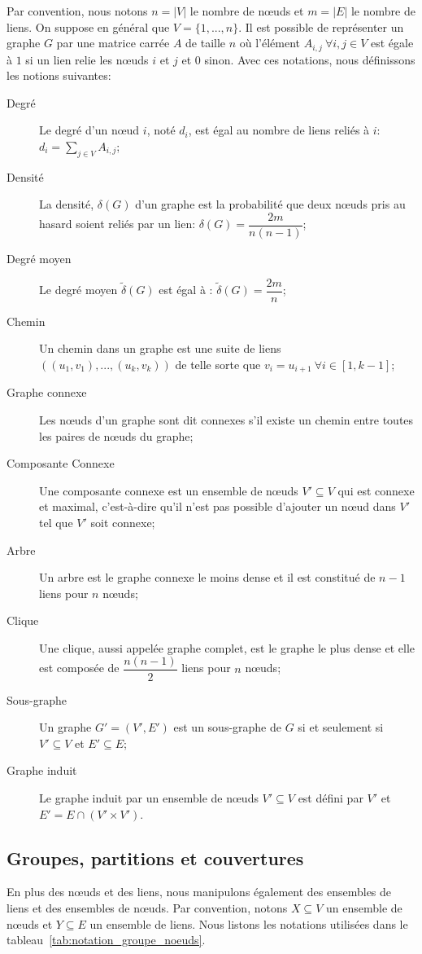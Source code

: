 Par convention, nous notons $n=|V|$ le nombre de n\oe{}uds et $m=|E|$ le nombre de liens.
On suppose en général que $V=\{1, ..., n\}$.
Il est possible de représenter un graphe $G$ par une matrice carrée $A$ de taille $n$ où l'élément $A_{i,j} \ \forall i,j \in V$ est égale à $1$ si un lien relie les n\oe{}uds $i$ et $j$ et $0$ sinon.
Avec ces notations, nous définissons les notions suivantes:
\begin{description}
\item[Degré] Le degré d'un n\oe{}ud $i$, noté $d_i$, est égal au nombre de liens reliés à $i$: $d_i = \sum_{j \in V} A_{i,j}$;
\item[Densité] La densité, $\delta(G)$ d'un graphe est la probabilité que deux n\oe{}uds pris au hasard soient reliés par un lien: $\delta(G)=\dfrac{2m}{n(n-1)}$;
\item[Degré moyen] Le degré moyen $\tilde{\delta}(G)$ est égal à : $\tilde{\delta}(G)=\dfrac{2m}{n}$;
\item[Chemin] Un chemin dans un graphe est une suite de liens $((u_1,v_1),...,(u_k,v_k))$ de telle sorte que $v_{i}=u_{i+1} \ \forall i \in [1,k-1]$;
\item[Graphe connexe] Les n\oe{}uds d'un graphe sont dit connexes s'il existe un chemin entre toutes les paires de n\oe{}uds du graphe;
\item[Composante Connexe] Une composante connexe est un ensemble de n\oe{}uds $V'\subseteq V$ qui est connexe et maximal, c'est-à-dire qu'il n'est pas possible d'ajouter un n\oe{}ud dans $V'$ tel que $V'$ soit connexe;
\item[Arbre] Un arbre est le graphe connexe le moins dense et il est constitué de $n-1$ liens pour $n$ n\oe{}uds;
\item[Clique] Une clique, aussi appelée graphe complet, est le graphe le plus dense et elle est composée de $\dfrac{n(n-1)}{2}$ liens pour $n$ n\oe{}uds;
\item[Sous-graphe] Un graphe $G'=(V',E')$ est un sous-graphe de $G$ si et seulement si $V' \subseteq V$ et $E' \subseteq E$;
\item[Graphe induit] Le graphe induit par un ensemble de n\oe{}uds $V' \subseteq V$ est défini par $V'$ et $E'= E \cap (V' \times V')$.  
\end{description}



\subsection{Groupes, partitions et couvertures}
En plus des n\oe{}uds et des liens, nous manipulons également des ensembles de liens et des ensembles de n\oe{}uds.
Par convention, notons $X \subseteq V$ un ensemble de n\oe{}uds et $Y \subseteq E$ un ensemble de liens.
Nous listons les notations utilisées dans le tableau~\ref{tab:notation_groupe_noeuds}.


